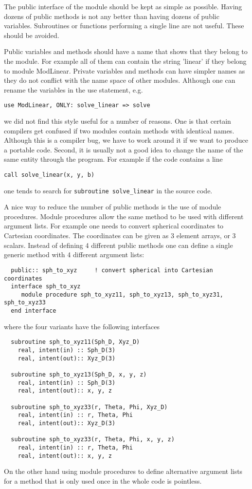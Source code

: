 \documentclass{article}
\begin{document}
The public interface of the module should be kept as simple as possible. Having
dozens of public methods is not any better than having dozens of public 
variables. Subroutines or functions performing a single line are not useful.
These should be avoided.

Public variables and methods should have a name that shows that they belong
to the module. For example all of them can contain the string 'linear' if
they belong to module ModLinear. Private variables and methods can have
simpler names as they do not conflict with the name space of other modules.
Although one can rename the variables in the use statement, e.g.
\begin{verbatim}
use ModLinear, ONLY: solve_linear => solve
\end{verbatim}
we did not find this style useful for a number of reasons. One is that certain
compilers get confused if two modules contain methods with identical names. 
Although this is a compiler bug, we have to work around it if we want to 
produce a portable code. Second, it is usually not a good idea to change
the name of the same entity through the program. For example if the code
contains a line
\begin{verbatim}
call solve_linear(x, y, b)
\end{verbatim}
one tends to search for {\tt subroutine solve\_linear} in the source code.

A nice way to reduce the number of public methods is the use of module
procedures. Module procedures allow the same method to be used with
different argument lists. For example one needs to convert spherical 
coordinates to Cartesian coordinates. The coordinates can be given as 
3 element arrays, or 3 scalars. Instead of defining 4 different public methods
one can define a single generic method with 4 different argument lists:
\begin{verbatim}
  public:: sph_to_xyz     ! convert spherical into Cartesian coordinates
  interface sph_to_xyz
     module procedure sph_to_xyz11, sph_to_xyz13, sph_to_xyz31, sph_to_xyz33
  end interface
\end{verbatim}
where the four variants have the following interfaces
\begin{verbatim}
  subroutine sph_to_xyz11(Sph_D, Xyz_D)
    real, intent(in) :: Sph_D(3)
    real, intent(out):: Xyz_D(3)

  subroutine sph_to_xyz13(Sph_D, x, y, z)
    real, intent(in) :: Sph_D(3)
    real, intent(out):: x, y, z

  subroutine sph_to_xyz33(r, Theta, Phi, Xyz_D)
    real, intent(in) :: r, Theta, Phi
    real, intent(out):: Xyz_D(3)

  subroutine sph_to_xyz33(r, Theta, Phi, x, y, z)
    real, intent(in) :: r, Theta, Phi
    real, intent(out):: x, y, z
\end{verbatim}
On the other hand using module procedures to define alternative argument
lists for a method that is only used once in the whole code is pointless.
\end{document}

